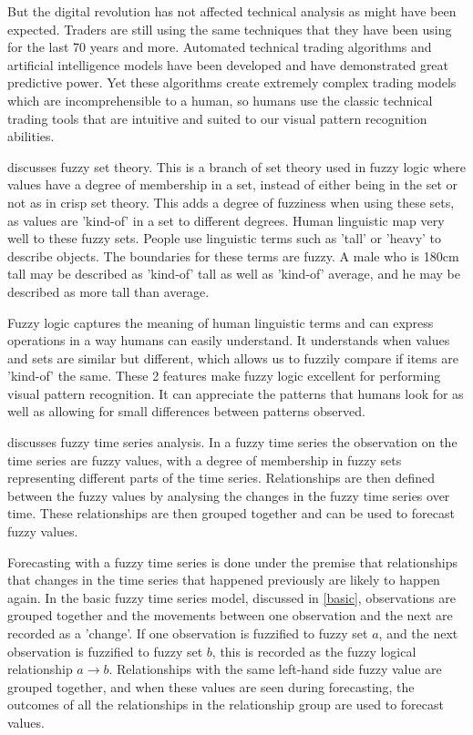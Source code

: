 \documentclass[12pt]{article}
\theoremstyle{definition}
\begin{document}
But the digital revolution has not affected technical analysis as might have been expected. Traders are still using the same techniques that they have been using for the last 70 years and more. Automated technical trading algorithms and artificial intelligence models have been developed and have demonstrated great predictive power. Yet these algorithms create extremely complex trading models which are incomprehensible to a human, so humans use the classic technical trading tools that are intuitive and suited to our visual pattern recognition abilities.

 discusses fuzzy set theory. This is a branch of set theory used in fuzzy logic where values have a degree of membership in a set, instead of either being in the set or not as in crisp set theory. This adds a degree of fuzziness when using these sets, as values are 'kind-of' in a set to different degrees. Human linguistic map very well to these fuzzy sets. People use linguistic terms such as 'tall' or 'heavy' to describe objects. The boundaries for these terms are fuzzy. A male who is 180cm tall may be described as 'kind-of' tall as well as 'kind-of' average, and he may be described as more tall than average.

Fuzzy logic captures the meaning of human linguistic terms and can express operations in a way humans can easily understand. It understands when values and sets are similar but different, which allows us to fuzzily compare if items are 'kind-of' the same. These 2 features make fuzzy logic excellent for performing visual pattern recognition. It can appreciate the patterns that humans look for as well as allowing for small differences between patterns observed.

 discusses fuzzy time series analysis. In a fuzzy time series the observation on the time series are fuzzy values, with a degree of membership in fuzzy sets representing different parts of the time series. Relationships are then defined between the fuzzy values by analysing the changes in the fuzzy time series over time. These relationships are then grouped together and can be used to forecast fuzzy values.

Forecasting with a fuzzy time series is done under the premise that relationships that changes in the time series that happened previously are likely to happen again. In the basic fuzzy time series model, discussed in \cref{basic}, observations are grouped together and the movements between one observation and the next are recorded as a 'change'. If one observation is fuzzified to fuzzy set $a$, and the next observation is fuzzified to fuzzy set $b$, this is recorded as the fuzzy logical relationship $a \rightarrow b$. Relationships with the same left-hand side fuzzy value are grouped together, and when these values are seen during forecasting, the outcomes of all the relationships in the relationship group are used to forecast values.
\end{document}
